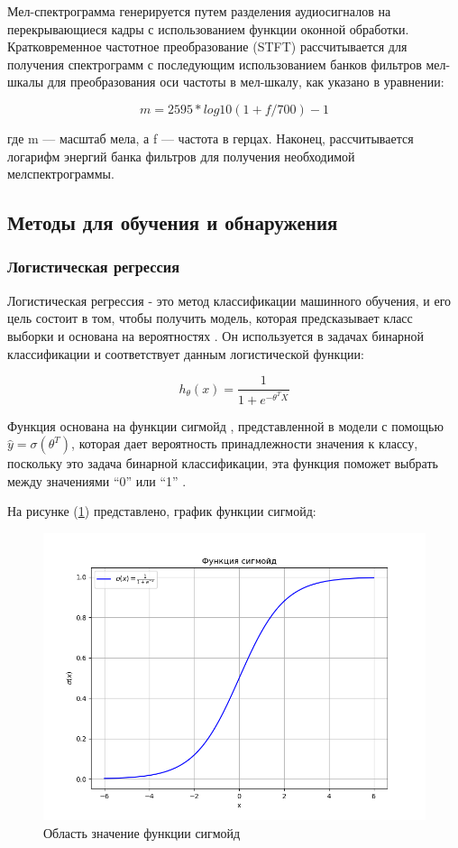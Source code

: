Мел-спектрограмма генерируется путем разделения аудиосигналов на перекрывающиеся кадры с использованием функции оконной обработки. Кратковременное частотное преобразование (STFT) рассчитывается для получения спектрограмм с последующим использованием банков фильтров мел-шкалы для преобразования оси частоты в мел-шкалу, как указано в уравнении: 

\begin{equation}
    m = 2595 * log 10(1 + f / 700) - 1
\end{equation}

где m — масштаб мела, а f — частота в герцах. Наконец, рассчитывается логарифм энергий банка фильтров для получения необходимой мелспектрограммы.

\subsection{Методы для обучения и обнаружения}

\subsubsection{Логистическая регрессия}

Логистическая регрессия - это метод классификации машинного обучения, и его цель состоит в том, чтобы получить модель, которая предсказывает класс выборки и основана на вероятностях \cite{isak2020logistic}. Он используется в задачах бинарной классификации и соответствует данным логистической функции:

\begin{equation}
    h_{\theta}(x) = \frac{1}{1 + e^{-\theta^{T} X}}
\end{equation}

Функция основана на функции сигмойд \cite{fig:sigmoid-func}, представленной в модели с помощью \(\hat{y} = \sigma (\theta^{T})\), которая дает вероятность принадлежности значения к классу, поскольку это задача бинарной классификации, эта функция поможет выбрать между значениями “0” или “1” \cite{javed2012automatic}.

На рисунке (\ref{fig:sigmoid-func}) представлено, график функции сигмойд: 
\begin{figure}[H]
	\centering
	\includegraphics[width=0.8\linewidth]{images/sigmoid.png}
	\caption{Область значение функции сигмойд}
	\label{fig:sigmoid-func}
\end{figure}


